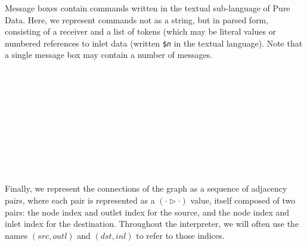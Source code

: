 Message boxes contain commands written in the textual sub-language of Pure
Data. Here, we represent commands not as a string, but in parsed form,
consisting of a receiver and a list of tokens (which may be literal values or
numbered references to inlet data (written \texttt{\$\emph{n}} in the textual language).
Note that a single message box may contain a number of messages.

\begin{hscode}\SaveRestoreHook
{}%
%
%
%
%
%
%
%
\>[B]{}\;\mathrel{=}\;\<[E]%
\\
\>[B]{}\<[4]%
\>[4]{}\;\<[E]%
\\[\blanklineskip]%
\>[B]{}\;\<[18]%
\>[18]{}\mathrel{=}{}\<[21]%
\>[21]{}\<[E]%
\\
\>[18]{}\mid {}\<[21]%
\>[21]{}\;\<[E]%
\\
\>[18]{}\mid {}\<[21]%
\>[21]{}\;\<[E]%
\\
\>[18]{}\mid {}\<[21]%
\>[21]{}\<[E]%
\\
\>[B]{}\<[4]%
\>[4]{}\;\<[E]%
\\[\blanklineskip]%
\>[B]{}\;\<[15]%
\>[15]{}\mathrel{=}{}\<[15E]%
\>[18]{}\;{}\<[29]%
\>[29]{}\<[E]%
\\
\>[15]{}\mid {}\<[15E]%
\>[18]{}\;{}\<[29]%
\>[29]{}\<[E]%
\\
\>[B]{}\<[4]%
\>[4]{}\;\<[E]%
\ColumnHook
\end{hscode}\resethooks

Finally, we represent the connections of the graph as a sequence of adjacency
pairs, where each pair is represented as a \ensuremath{(\cdot \rhd \cdot )} value, itself
composed of two pairs: the node index and outlet index for the source, and the
node index and inlet index for the destination. Throughout the interpreter, we
will often use the names $(src, outl)$ and $(dst, inl)$ to refer to those
indices.

